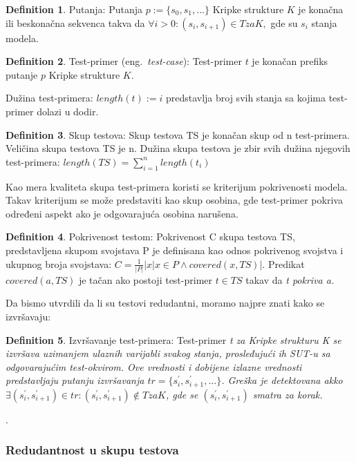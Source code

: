 \documentclass[a4paper]{article}
\theoremstyle{definition}
\newtheorem{definition}{Definition}[section]
\begin{document}
\begin{definition}{Putanja:}
Putanja $ p := \{s_0, s_1, ...\}$ Kripke strukture $K$ je konačna ili beskonačna sekvenca takva da $ \forall i > 0 : (s_i, s_{i+1}) \in T za K, $ gde su $ s_i $ stanja modela.
\end{definition}

\begin{definition}{Test-primer (eng.~{\em test-case}):}
Test-primer $t$ je konačan prefiks putanje $p$ Kripke strukture $K$.
\end{definition}

Dužina test-primera: $ length(t) := i$ predstavlja broj svih stanja sa kojima test-primer dolazi u dodir.

\begin{definition}{Skup testova:}
Skup testova TS je konačan skup od n test-primera. Veličina skupa testova TS je n. Dužina skupa testova je zbir svih dužina njegovih test-primera: $
    length(TS) = \sum_{i=1}^{n}length(t_i)$
\end{definition}

Kao mera kvaliteta skupa test-primera koristi se kriterijum pokrivenosti modela. Takav kriterijum se može predstaviti kao skup osobina, gde test-primer pokriva određeni aspekt ako je odgovarajuća osobina narušena.

\begin{definition}{Pokrivenost testom:}
Pokrivenost C skupa testova TS, predstavljena skupom svojstava P je definisana kao odnos pokrivenog svojstva i ukupnog broja svojstava:
$
    C = \frac{1}{|P|}|{x|x \in P \land covered(x,TS)}|
$. Predikat $ covered(a, TS)$ je tačan ako postoji test-primer $ t \in TS$ takav da \em{t} pokriva \em{a}.
\end{definition}

Da bismo utvrdili da li su testovi redudantni, moramo najpre znati kako se izvršavaju:

\begin{definition}{Izvršavanje test-primera:}
Test-primer \em{t} za Kripke strukturu K se izvršava uzimanjem ulaznih varijabli svakog stanja, prosleđujući ih SUT-u sa odgovarajućim test-okvirom. Ove vrednosti i dobijene izlazne vrednosti predstavljaju putanju izvršavanja $ tr = \{s_{i}^{'}, s_{i+1}^{'}, ...\} $. Greška je detektovana akko $ \exists (s_{i}^{'}, s_{i+1}^{'}) \in tr : (s_{i}^{'}, s_{i+1}^{'}) \notin T za K $, gde se $ (s_{i}^{'}, s_{i+1}^{'})$ smatra za korak.
\end{definition}.

\subsubsection{Redudantnost u skupu testova}
\label{subsubsec:redudantnost}
\end{document}
